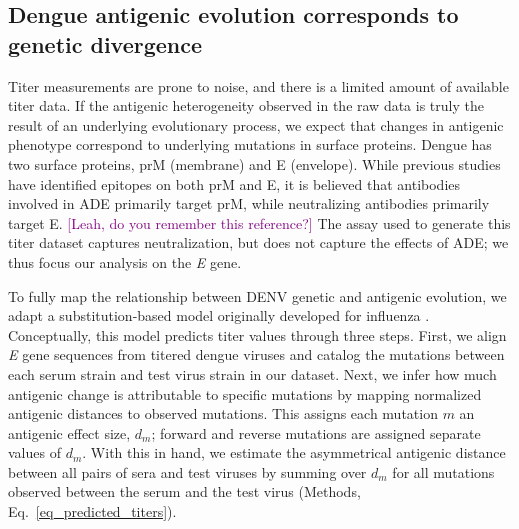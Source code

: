 \documentclass[11pt,oneside,letterpaper]{article}
\def\sbc#1{\textcolor{purple}{[#1]}}
\begin{document}
\subsection*{Dengue antigenic evolution corresponds to genetic divergence}
Titer measurements are prone to noise, and there is a limited amount of available titer data.
If the antigenic heterogeneity observed in the raw data is truly the result of an underlying evolutionary process, we expect that changes in antigenic phenotype correspond to underlying mutations in surface proteins.
Dengue has two surface proteins, prM (membrane) and E (envelope).
While previous studies have identified epitopes on both prM and E, it is believed that antibodies involved in ADE primarily target prM, while neutralizing antibodies primarily target E. \sbc{Leah, do you remember this reference?}
The assay used to generate this titer dataset captures neutralization, but does not capture the effects of ADE; we thus focus our analysis on the \textit{E} gene.

To fully map the relationship between DENV genetic and antigenic evolution, we adapt a substitution-based model originally developed for influenza \citep{neher2016prediction}.
Conceptually, this model predicts titer values through three steps.
First, we align \textit{E} gene sequences from titered dengue viruses and catalog the mutations between each serum strain and test virus strain in our dataset.
Next, we infer how much antigenic change is attributable to specific mutations by mapping normalized antigenic distances to observed mutations.
This assigns each mutation $m$ an antigenic effect size, $d_m$; forward and reverse mutations are assigned separate values of $d_m$.
With this in hand, we estimate the asymmetrical antigenic distance between all pairs of sera and test viruses by summing over $d_m$ for all mutations observed between the serum and the test virus (Methods, Eq.~\ref{eq_predicted_titers}).
\end{document}
